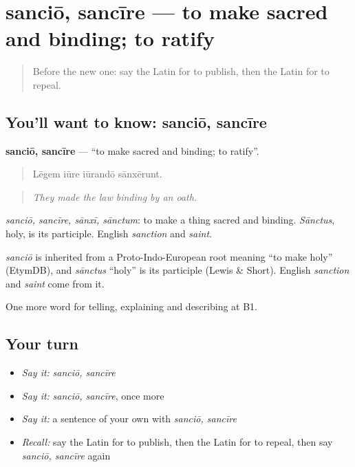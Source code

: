 \section[sanciō, sancīre]{sanciō, sancīre — to make sacred and binding; to ratify}

\label{lesson:LA-C410-sancio}



\begin{quote}
Before the new one: say the Latin for to publish, then the Latin for to repeal.
\end{quote}

\subsection*{You'll want to know: sanciō, sancīre}
\textbf{sanciō, sancīre} — \textquotedblleft{}to make sacred and binding; to ratify\textquotedblright{}.

\begin{quote}
Lēgem iūre iūrandō sānxērunt.
\end{quote}

\begin{quote}
\emph{They made the law binding by an oath.}
\end{quote}

\emph{sanciō, sancīre, sānxī, sānctum}: to make a thing sacred and binding. \emph{Sānctus}, holy, is its participle. English \emph{sanction} and \emph{saint}.

\begin{cousinweb}
\emph{sanciō} is inherited from a Proto-Indo-European root meaning \textquotedblleft{}to make holy\textquotedblright{} (EtymDB), and \emph{sānctus} \textquotedblleft{}holy\textquotedblright{} is its participle (Lewis \& Short). English \emph{sanction} and \emph{saint} come from it.
\end{cousinweb}

\begin{grammarlens}[title={What you've built}]
One more word for telling, explaining and describing at B1.
\end{grammarlens}

\subsection*{Your turn}
\begin{itemize}
\raggedright
  \item \emph{Say it:} \emph{sanciō, sancīre}
  \item \emph{Say it:} \emph{sanciō, sancīre}, once more
  \item \emph{Say it:} a sentence of your own with \emph{sanciō, sancīre}
  \item \emph{Recall:} say the Latin for to publish, then the Latin for to repeal, then say \emph{sanciō, sancīre} again
\end{itemize}

